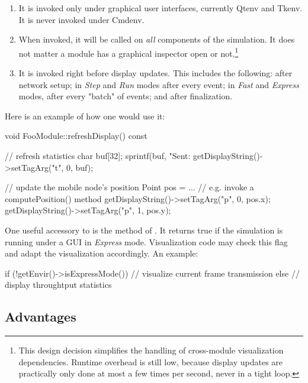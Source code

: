 \begin{enumerate}
\item It is invoked only under graphical user interfaces, currently Qtenv
     and Tkenv. It is never invoked under Cmdenv.

\item When invoked, it will be called on \textit{all} components of the
      simulation. It does not matter a module has a graphical inspector
      open or not.\footnote{This design decision simplifies the handling
      of cross-module visualization dependencies. Runtime overhead is
      still low, because display updates are practically only done at most
      a few times per second, never in a tight loop.}

\item It is invoked right before display updates. This includes the following:
      after network setup; in \textit{Step} and \textit{Run} modes after every event;
      in \textit{Fast} and \textit{Express} modes, after every "batch" of events;
      and after finalization.

\end{enumerate}

Here is an example of how one would use it:

\begin{cpp}
void FooModule::refreshDisplay() const
{
    // refresh statistics
    char buf[32];
    sprintf(buf, "Sent:%
    getDisplayString()->setTagArg("t", 0, buf);

    // update the mobile node's position
    Point pos = ...  // e.g. invoke a computePosition() method
    getDisplayString()->setTagArg("p", 0, pos.x);
    getDisplayString()->setTagArg("p", 1, pos.y);
}
\end{cpp}

One useful accessory to  is the
 method of . It returns true if the
simulation is running under a GUI in \textit{Express} mode. Visualization
code may check this flag and adapt the visualization accordingly. An example:

\begin{cpp}
if (!getEnvir()->isExpressMode()) {
    // visualize current frame transmission
}
else {
    // display throughtput statistics
}
\end{cpp}


\subsection{Advantages}
\label{sec:graphics:refreshdisplay-advantages}

